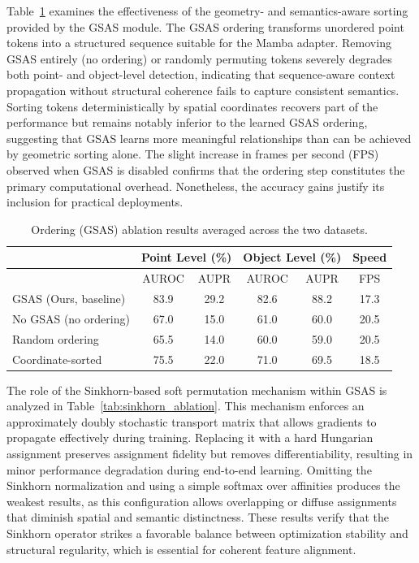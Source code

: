 Table~\ref{tab:gsas_ablation} examines the effectiveness of the geometry- and semantics-aware sorting provided by the GSAS module. The GSAS ordering transforms unordered point tokens into a structured sequence suitable for the Mamba adapter. Removing GSAS entirely (no ordering) or randomly permuting tokens severely degrades both point- and object-level detection, indicating that sequence-aware context propagation without structural coherence fails to capture consistent semantics. Sorting tokens deterministically by spatial coordinates recovers part of the performance but remains notably inferior to the learned GSAS ordering, suggesting that GSAS learns more meaningful relationships than can be achieved by geometric sorting alone. The slight increase in frames per second (FPS) observed when GSAS is disabled confirms that the ordering step constitutes the primary computational overhead. Nonetheless, the accuracy gains justify its inclusion for practical deployments.

\begin{table}[ht]
\centering
\caption{Ordering (GSAS) ablation results averaged across the two datasets.}
\label{tab:gsas_ablation}
\begin{tabular}{l|cc|cc|c}
\hline
& \multicolumn{2}{c|}{Point Level (\%)} & \multicolumn{2}{c|}{Object Level (\%)} & Speed \\
\hline
& AUROC & AUPR & AUROC & AUPR & FPS \\  
\hline
GSAS (Ours, baseline) & 83.9 & 29.2 & 82.6 & 88.2 & 17.3 \\
No GSAS (no ordering) & 67.0 & 15.0 & 61.0 & 60.0 & 20.5 \\
Random ordering & 65.5 & 14.0 & 60.0 & 59.0 & 20.5 \\
Coordinate-sorted & 75.5 & 22.0 & 71.0 & 69.5 & 18.5 \\
\hline
\end{tabular}
\end{table}

The role of the Sinkhorn-based soft permutation mechanism within GSAS is analyzed in Table~\ref{tab:sinkhorn_ablation}. This mechanism enforces an approximately doubly stochastic transport matrix that allows gradients to propagate effectively during training. Replacing it with a hard Hungarian assignment preserves assignment fidelity but removes differentiability, resulting in minor performance degradation during end-to-end learning. Omitting the Sinkhorn normalization and using a simple softmax over affinities produces the weakest results, as this configuration allows overlapping or diffuse assignments that diminish spatial and semantic distinctness. These results verify that the Sinkhorn operator strikes a favorable balance between optimization stability and structural regularity, which is essential for coherent feature alignment.

